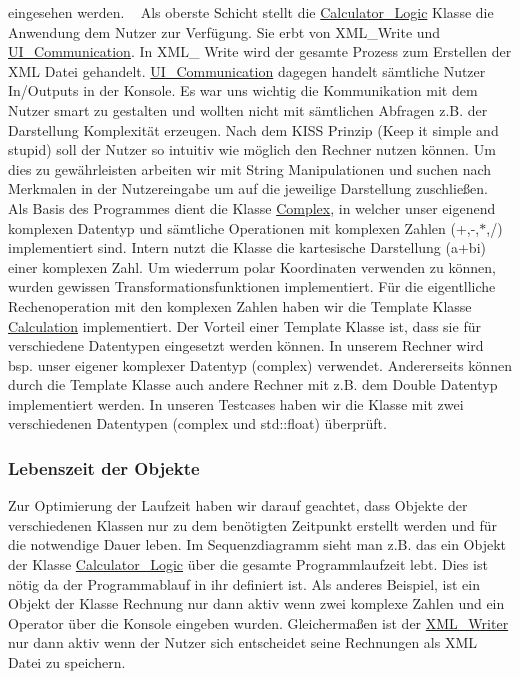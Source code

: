 eingesehen werden. ~\newline
 Als oberste Schicht stellt die {\ttfamily \mbox{\hyperlink{class_calculator___logic}{Calculator\+\_\+\+Logic}}} Klasse die Anwendung dem Nutzer zur Verfügung. Sie erbt von {\ttfamily X\+M\+L\+\_\+\+Write} und {\ttfamily \mbox{\hyperlink{class_u_i___communication}{U\+I\+\_\+\+Communication}}}. In {\ttfamily X\+M\+L\+\_\+ Write} wird der gesamte Prozess zum Erstellen der X\+ML Datei gehandelt. {\ttfamily \mbox{\hyperlink{class_u_i___communication}{U\+I\+\_\+\+Communication}}} dagegen handelt sämtliche Nutzer In/\+Outputs in der Konsole. Es war uns wichtig die Kommunikation mit dem Nutzer smart zu gestalten und wollten nicht mit sämtlichen Abfragen z.\+B. der Darstellung Komplexität erzeugen. Nach dem K\+I\+SS Prinzip (Keep it simple and stupid) soll der Nutzer so intuitiv wie möglich den Rechner nutzen können. Um dies zu gewährleisten arbeiten wir mit String Manipulationen und suchen nach Merkmalen in der Nutzereingabe um auf die jeweilige Darstellung zuschließen. ~\newline
 Als Basis des Programmes dient die Klasse {\ttfamily \mbox{\hyperlink{class_complex}{Complex}}}, in welcher unser eigenend komplexen Datentyp und sämtliche Operationen mit komplexen Zahlen (+,-\/,$\ast$,/) implementiert sind. Intern nutzt die Klasse die kartesische Darstellung (a+bi) einer komplexen Zahl. Um wiederrum polar Koordinaten verwenden zu können, wurden gewissen Transformationsfunktionen implementiert. Für die eigentlliche Rechenoperation mit den komplexen Zahlen haben wir die Template Klasse \textquotesingle{}\mbox{\hyperlink{class_calculation}{Calculation}}\textquotesingle{} implementiert. Der Vorteil einer Template Klasse ist, dass sie für verschiedene Datentypen eingesetzt werden können. In unserem Rechner wird bsp. unser eigener komplexer Datentyp (complex) verwendet. Andererseits können durch die Template Klasse auch andere Rechner mit z.\+B. dem Double Datentyp implementiert werden. In unseren Testcases haben wir die Klasse mit zwei verschiedenen Datentypen (complex und std\+::float) überprüft.

\subsubsection*{Lebenszeit der Objekte}

Zur Optimierung der Laufzeit haben wir darauf geachtet, dass Objekte der verschiedenen Klassen nur zu dem benötigten Zeitpunkt erstellt werden und für die notwendige Dauer leben. Im Sequenzdiagramm sieht man z.\+B. das ein Objekt der Klasse {\ttfamily \mbox{\hyperlink{class_calculator___logic}{Calculator\+\_\+\+Logic}}} über die gesamte Programmlaufzeit lebt. Dies ist nötig da der Programmablauf in ihr definiert ist. Als anderes Beispiel, ist ein Objekt der Klasse {\ttfamily Rechnung} nur dann aktiv wenn zwei komplexe Zahlen und ein Operator über die Konsole eingeben wurden. Gleichermaßen ist der \mbox{\hyperlink{class_x_m_l___writer}{X\+M\+L\+\_\+\+Writer}} nur dann aktiv wenn der Nutzer sich entscheidet seine Rechnungen als X\+ML Datei zu speichern. ~\newline
